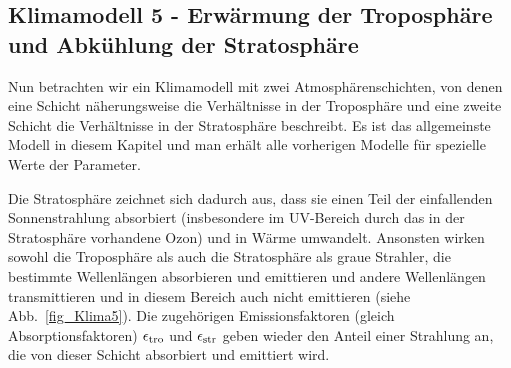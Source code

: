 \subsection{Klimamodell 5 - Erw\"armung der Troposph\"are und Abk\"uhlung der Stratosph\"are}
\label{sec_Klima5}

Nun betrachten wir ein Klimamodell mit zwei Atmosph\"arenschichten, von denen
eine Schicht n\"aherungsweise die Verh\"altnisse in der Troposph\"are und eine zweite
Schicht die Verh\"altnisse in der Stratosph\"are beschreibt. Es ist das allgemeinste Modell in diesem
Kapitel und man erh\"alt alle vorherigen Modelle f\"ur spezielle Werte der Parameter. 

Die Stratosph\"are
zeichnet sich dadurch aus, dass sie einen Teil der einfallenden Sonnenstrahlung
absorbiert (insbesondere im UV-Bereich durch das in der Stratosph\"are vorhandene
Ozon) und in W\"arme umwandelt. Ansonsten wirken sowohl die Troposph\"are als
auch die Stratosph\"are als \glqq graue Strahler\grqq, die bestimmte Wellenl\"angen
absorbieren und emittieren und andere Wellenl\"angen transmittieren und in diesem
Bereich auch nicht emittieren (siehe Abb.\ \ref{fig_Klima5}). Die zugeh\"origen
Emissionsfaktoren (gleich Absorptionsfaktoren) $\epsilon_{\rm tro}$ und $\epsilon_{\rm str}$
geben wieder den Anteil einer Strahlung an, die von dieser Schicht absorbiert und
emittiert wird. 

